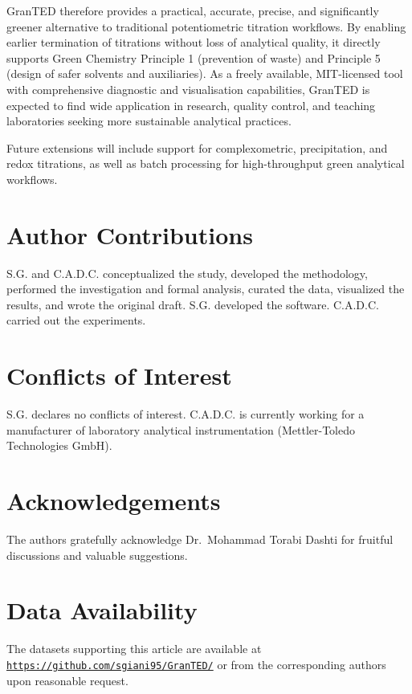 \documentclass[twoside,twocolumn,9pt]{article}
\begin{document}
\textsf{GranTED} therefore provides a practical, accurate, precise, and significantly greener alternative to traditional potentiometric titration workflows. By enabling earlier termination of titrations without loss of analytical quality, it directly supports Green Chemistry Principle 1 (prevention of waste) and Principle 5 (design of safer solvents and auxiliaries). As a freely available, MIT-licensed tool with comprehensive diagnostic and visualisation capabilities, \textsf{GranTED} is expected to find wide application in research, quality control, and teaching laboratories seeking more sustainable analytical practices.

Future extensions will include support for complexometric, precipitation, and redox titrations, as well as batch processing for high-throughput green analytical workflows.

\section*{Author Contributions}

S.G. and C.A.D.C. conceptualized the study, developed the methodology, performed the investigation and formal analysis, curated the data, visualized the results, and wrote the original draft. S.G. developed the software. C.A.D.C. carried out the experiments.

\section*{Conflicts of Interest}

S.G. declares no conflicts of interest. C.A.D.C. is currently working for a manufacturer of laboratory analytical instrumentation (Mettler-Toledo Technologies GmbH).

\section*{Acknowledgements}

The authors gratefully acknowledge Dr.~Mohammad Torabi Dashti for fruitful discussions and valuable suggestions.

\section*{Data Availability}

The datasets supporting this article are available at \href{https://github.com/sgiani95/GranTED/}{\texttt{https://github.com/sgiani95/GranTED/}} or from the corresponding authors upon reasonable request.



\end{document}
